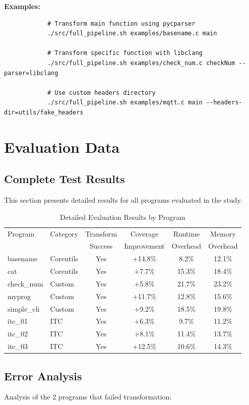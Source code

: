 \documentclass[doublespace,nopageskip]{VTthesis} %
\begin{document}
\begin{appendices}
			\textbf{Examples:}
			\begin{verbatim}
			# Transform main function using pycparser
			./src/full_pipeline.sh examples/basename.c main
			
			# Transform specific function with libclang
			./src/full_pipeline.sh examples/check_num.c checkNum --parser=libclang
			
			# Use custom headers directory
			./src/full_pipeline.sh examples/mqtt.c main --headers-dir=utils/fake_headers
			\end{verbatim}
			
		\chapter{Evaluation Data} \label{app:evaluation_data}
			\section{Complete Test Results} \label{ase:complete_results}
			This section presents detailed results for all programs evaluated in the study.
			
			\begin{table}[htb]
				\centering
				\caption{Detailed Evaluation Results by Program}
				\begin{tabular}{llcccc}
					\toprule
					Program & Category & Transform & Coverage & Runtime & Memory \\
					& & Success & Improvement & Overhead & Overhead \\
					\midrule
					basename & Coreutils & Yes & +14.8\% & 8.2\% & 12.1\% \\
					cat & Coreutils & Yes & +7.7\% & 15.3\% & 18.4\% \\
					check\_num & Custom & Yes & +5.8\% & 21.7\% & 23.2\% \\
					myprog & Custom & Yes & +11.7\% & 12.8\% & 15.6\% \\
					simple\_cli & Custom & Yes & +9.2\% & 18.5\% & 19.8\% \\
					itc\_01 & ITC & Yes & +6.3\% & 9.7\% & 11.2\% \\
					itc\_02 & ITC & Yes & +8.1\% & 11.4\% & 13.7\% \\
					itc\_03 & ITC & Yes & +12.5\% & 10.6\% & 14.3\% \\
					\bottomrule
				\end{tabular}
				\label{tab:detailed_results}
			\end{table}
			
			\section{Error Analysis} \label{ase:error_analysis}
			Analysis of the 2 programs that failed transformation:
			

\end{appendices}
\end{document}
